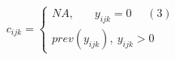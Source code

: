 \documentclass[12pt]{article}
\begin{document}
$$
c_{ijk} = 
\begin{cases}
NA, \ \ \ \ \ \ \  \ y_{ijk} = 0 \ \ \ \ \ \  (3) \\
prev(y_{ijk}), \ y_{ijk} > 0  
\end{cases}
$$
\end{document}
